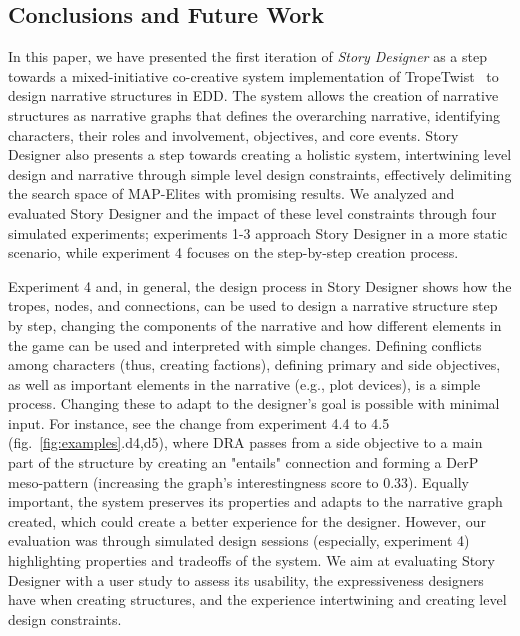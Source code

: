 \subsection{Conclusions and Future Work}


In this paper, we have presented the first iteration of \emph{Story Designer} as a step towards a mixed-initiative co-creative system implementation of TropeTwist~\cite{p11alvarez_tropetwist_2022} to design narrative structures in EDD. The system allows the creation of narrative structures as narrative graphs that defines the overarching narrative, identifying characters, their roles and involvement, objectives, and core events. Story Designer also presents a step towards creating a holistic system, intertwining level design and narrative through simple level design constraints, effectively delimiting the search space of MAP-Elites with promising results. We analyzed and evaluated Story Designer and the impact of these level constraints through four simulated experiments; experiments 1-3 approach Story Designer in a more static scenario, while experiment 4 focuses on the step-by-step creation process.

Experiment 4 and, in general, the design process in Story Designer shows how the tropes, nodes, and connections, can be used to design a narrative structure step by step, changing the components of the narrative and how different elements in the game can be used and interpreted with simple changes. Defining conflicts among characters (thus, creating factions), defining primary and side objectives, as well as important elements in the narrative (e.g., plot devices), is a simple process. Changing these to adapt to the designer's goal is possible with minimal input. For instance, see the change from experiment 4.4 to 4.5 (fig.~\ref{fig:examples}.d4,d5), where DRA passes from a side objective to a main part of the structure by creating an "entails" connection and forming a DerP meso-pattern (increasing the graph's interestingness score to 0.33). Equally important, the system preserves its properties and adapts to the narrative graph created, which could create a better experience for the designer. However, our evaluation was through simulated design sessions (especially, experiment 4) highlighting properties and tradeoffs of the system. We aim at evaluating Story Designer with a user study to assess its usability, the expressiveness designers have when creating structures, and the experience intertwining and creating level design constraints. 

